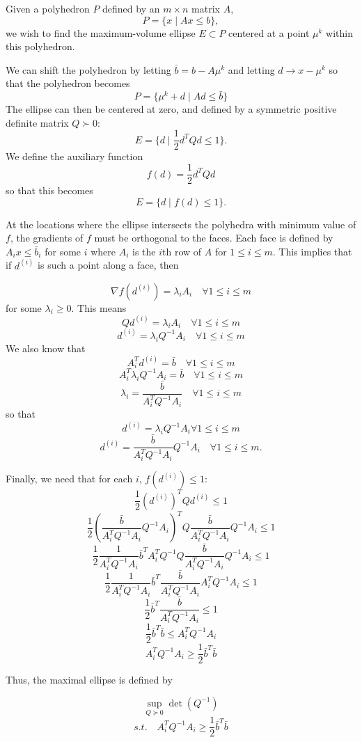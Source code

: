 Given a polyhedron $P$ defined by an $m \times n$ matrix $A$,
\[
P = \{ x \; | \;  Ax \le b \},
\]
we wish to find the maximum-volume ellipse $E \subset P$ centered at a point $\mu^{k}$ within this polyhedron.

We can shift the polyhedron by letting $\bar{b} = b - A\mu^{k}$ and letting $d \to x - \mu^{k}$ so that the polyhedron becomes
\[
P = \{ \mu^k + d \; | \;  Ad \le \bar{b} \}
\]
The ellipse can then be centered at zero, and defined by a symmetric positive definite matrix $Q \succ 0$:
\[
E = \{ d \; | \; \frac 1 2 d^T Q d \le 1 \}.
\]
We define the auxiliary function 
\[
f(d) = \frac 1 2 d^T Q d
\]
so that this becomes
\[
E = \{ d \; | \; f(d) \le 1 \}.
\]

At the locations where the ellipse intersects the polyhedra with minimum value of $f$, the gradients of $f$ must be orthogonal to the faces.
Each face is defined by $A_i x \le \bar{b}_i$ for some $i$ where $A_i$ is the $i$th row of $A$ for $1\le i \le m$.
This implies that if $d^{(i)}$ is such a point along a face, then



\[
\nabla f(d^{(i)}) = \lambda_i A_i \quad \forall 1\le i\le m
\]
for some $\lambda_i \ge 0$.
This means
\[
Q d^{(i)} = \lambda_i A_i \quad \forall 1\le i\le m
\]
\[
d^{(i)} = \lambda_i Q^{-1}A_i \quad \forall 1\le i\le m
\]
We also know that 
\[
A_i^T d^{(i)} = \bar{b} \quad \forall 1\le i\le m
\]
\[
A_i^T \lambda_i Q^{-1}A_i = \bar{b} \quad \forall 1\le i\le m
\]
\[
\lambda_i = \frac {\bar{b}}{A_i^T  Q^{-1}A_i} \quad \forall 1\le i\le m
\]
so that 
\[
d^{(i)} = \lambda_i Q^{-1}A_i \forall 1\le i\le m
\]
\[
d^{(i)} = \frac {\bar{b}}{A_i^T  Q^{-1}A_i}  Q^{-1}A_i \quad \forall 1\le i\le m.
\]

Finally, we need that for each $i$, $f(d^{(i)}) \le 1$:
\[
\frac 1 2 (d^{(i)})^{T} Q d^{(i)} \le 1
\]
\[
\frac 1 2 (\frac {\bar{b}}{A_i^T  Q^{-1}A_i}  Q^{-1}A_i)^{T} Q \frac {\bar{b}}{A_i^T  Q^{-1}A_i}  Q^{-1}A_i \le 1
\]
\[
\frac 1 2 \frac {1}{A_i^T  Q^{-1}A_i}  \bar{b}^T A_i^T Q^{-1} Q \frac {\bar{b}}{A_i^T  Q^{-1}A_i}  Q^{-1}A_i \le 1
\]
\[
\frac 1 2 \frac {1}{A_i^T  Q^{-1}A_i}  \bar{b}^T \frac {\bar{b}}{A_i^T  Q^{-1}A_i}  A_i^T Q^{-1}A_i \le 1
\]
\[
\frac 1 2 \bar{b}^T \frac {\bar{b}}{A_i^T  Q^{-1}A_i} \le 1
\]
\[
\frac 1 2 \bar{b}^T \bar{b}\le A_i^T  Q^{-1}A_i
\]
\[
A_i^T  Q^{-1}A_i \ge \frac 1 2 \bar{b}^T \bar{b}
\]

Thus, the maximal ellipse is defined by

\[
\sup_{Q \succeq 0} \det(Q^{-1})
\]
\[
s.t. \quad A_i^T Q^{-1} A_i \ge \frac 1 2 \bar{b}^T\bar{b}
\]


